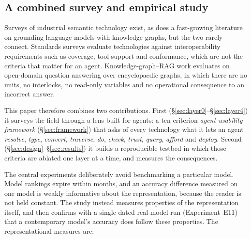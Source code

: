 \subsection{A combined survey and empirical study}

Surveys of industrial semantic technology exist, as does a fast-growing
literature on grounding language models with knowledge graphs, but the two rarely
connect. Standards surveys evaluate technologies against interoperability
requirements such as coverage, tool support and conformance, which are not the
criteria that matter for an agent. Knowledge-graph--RAG work evaluates on
open-domain question answering over encyclopaedic graphs, in which there are no
units, no interlocks, no read-only variables and no operational consequence to an
incorrect answer.

This paper therefore combines two contributions. First
(\S\ref{sec:layer0}--\S\ref{sec:layer4}) it surveys the field through a lens built
for agents: a ten-criterion
\emph{agent-usability framework} (\S\ref{sec:framework}) that asks of every
technology what it lets an agent \emph{resolve}, \emph{type}, \emph{convert},
\emph{traverse}, \emph{do}, \emph{check}, \emph{trust}, \emph{query},
\emph{afford} and \emph{deploy}. Second (\S\ref{sec:design}--\S\ref{sec:results})
it builds a reproducible testbed in which those criteria are ablated one layer at
a time, and measures the consequences.

The central experiments deliberately avoid benchmarking a particular model.
Model rankings expire within months, and an accuracy difference measured on one
model is weakly informative about the representation, because the reader is not
held constant. The study instead measures properties of the representation
itself, and then confirms with a single dated real-model run (Experiment~E11) that
a contemporary model's accuracy does follow these properties. The representational
measures are:

